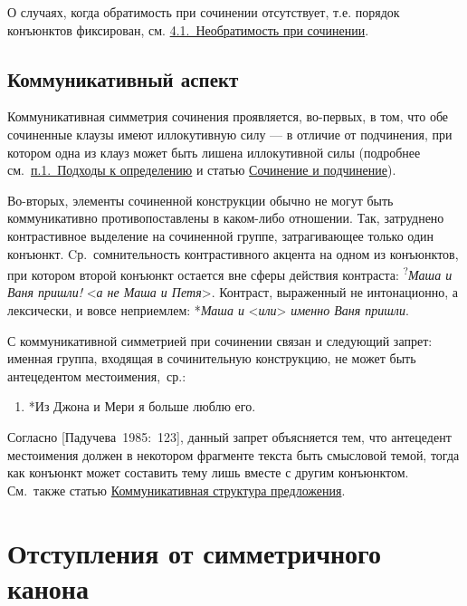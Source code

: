 О случаях, когда обратимость при сочинении отсутствует, т.е. порядок
конъюнктов фиксирован, см. \underline{4.1.~Необратимость при сочинении}.

\subsection{Коммуникативный
  аспект}\label{ux43aux43eux43cux43cux443ux43dux438ux43aux430ux442ux438ux432ux43dux44bux439-ux430ux441ux43fux435ux43aux442}

Коммуникативная симметрия сочинения проявляется, во-первых, в том, что
обе сочиненные клаузы имеют иллокутивную силу --- в отличие от
подчинения, при котором одна из клауз может быть лишена иллокутивной
силы (подробнее см.~\underline{п.1.~Подходы к определению} и статью
\underline{Сочинение и подчинение}).

Во-вторых, элементы сочиненной конструкции обычно не могут быть
коммуникативно противопоставлены в каком-либо отношении. Так, затруднено
контрастивное выделение на сочиненной группе, затрагивающее только один
конъюнкт. Cр.~сомнительность контрастивного акцента на одном из
конъюнктов, при котором второй конъюнкт остается вне сферы действия
контраста: \textsuperscript{?}\textit{Маша и Ваня пришли!}
\textless{}\textit{а не Маша и Петя}\textgreater. Контраст, выраженный не
интонационно, а лексически, и вовсе неприемлем: *\textit{Маша и}
\textless{}\textit{или}\textgreater{} \textit{именно Ваня пришли}.

С коммуникативной симметрией при сочинении связан и следующий запрет:
именная группа, входящая в сочинительную конструкцию, не может быть
антецедентом местоимения,~ср.:

\begin{enumerate}
  \def\labelenumi{(\arabic{enumi})}
  \setcounter{enumi}{24}
  \item
        *Из Джона и Мери я больше люблю его.
\end{enumerate}

Согласно {[}Падучева~1985:~123{]}, данный запрет объясняется тем, что
антецедент местоимения должен в некотором фрагменте текста быть
смысловой темой, тогда как конъюнкт может составить тему лишь вместе с
другим конъюнктом. См.~также статью \underline{Коммуникативная структура
  предложения}.

\section{Отступления от симметричного
  канона}\label{ux43eux442ux441ux442ux443ux43fux43bux435ux43dux438ux44f-ux43eux442-ux441ux438ux43cux43cux435ux442ux440ux438ux447ux43dux43eux433ux43e-ux43aux430ux43dux43eux43dux430}


